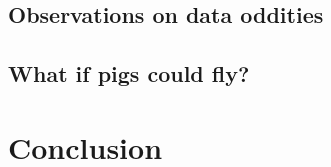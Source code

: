 \documentclass[12pt,a4paper]{article}
\begin{document}
\subsection{Observations on data oddities}
\label{sec:results-oddities}


\subsection{What if pigs could fly?} %

\section{Conclusion}

%
\end{document}
